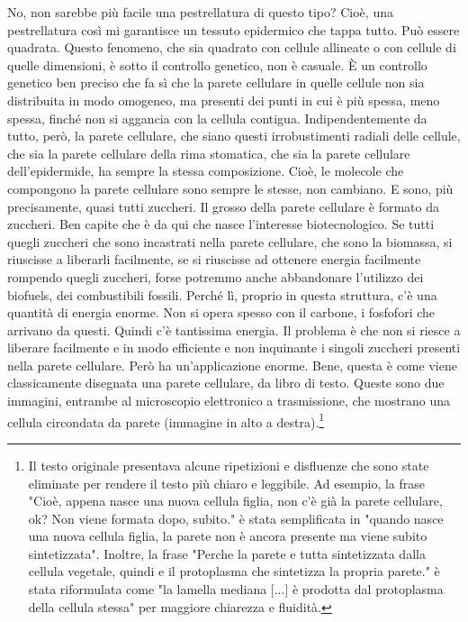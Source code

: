 \documentclass[11pt, a4paper]{article}
\begin{document}
\begin{spacing}{1.15}
No, non sarebbe più facile una pestrellatura di questo tipo? Cioè, una pestrellatura così mi garantisce un tessuto epidermico che tappa tutto. Può essere quadrata. Questo fenomeno, che sia quadrato con cellule allineate o con cellule di quelle dimensioni, è sotto il controllo genetico, non è casuale. È un controllo genetico ben preciso che fa sì che la parete cellulare in quelle cellule non sia distribuita in modo omogeneo, ma presenti dei punti in cui è più spessa, meno spessa, finché non si aggancia con la cellula contigua. Indipendentemente da tutto, però, la parete cellulare, che siano questi irrobustimenti radiali delle cellule, che sia la parete cellulare della rima stomatica, che sia la parete cellulare dell'epidermide, ha sempre la stessa composizione. Cioè, le molecole che compongono la parete cellulare sono sempre le stesse, non cambiano. E sono, più precisamente, quasi tutti zuccheri. Il grosso della parete cellulare è formato da zuccheri. Ben capite che è da qui che nasce l'interesse biotecnologico. Se tutti quegli zuccheri che sono incastrati nella parete cellulare, che sono la biomassa, si riuscisse a liberarli facilmente, se si riuscisse ad ottenere energia facilmente rompendo quegli zuccheri, forse potremmo anche abbandonare l'utilizzo dei biofuels, dei combustibili fossili. Perché lì, proprio in questa struttura, c'è una quantità di energia enorme.
Non si opera spesso con il carbone, i fosfofori che arrivano da questi. Quindi c'è tantissima energia. Il problema è che non si riesce a liberare facilmente e in modo efficiente e non inquinante i singoli zuccheri presenti nella parete cellulare. Però ha un'applicazione enorme. Bene, questa è come viene classicamente disegnata una parete cellulare, da libro di testo. Queste sono due immagini, entrambe al microscopio elettronico a trasmissione, che mostrano una cellula circondata da parete (immagine in alto a destra).\footnote{Il testo originale presentava alcune ripetizioni e disfluenze che sono state eliminate per rendere il testo più chiaro e leggibile. Ad esempio, la frase "Cioè, appena nasce una nuova cellula figlia, non c'è già la parete cellulare, ok? Non viene formata dopo, subito." è stata semplificata in "quando nasce una nuova cellula figlia, la parete non è ancora presente ma viene subito sintetizzata". Inoltre, la frase "Perche la parete e tutta sintetizzata dalla cellula vegetale, quindi e il protoplasma che sintetizza la propria parete." è stata riformulata come  "la lamella mediana [...] è prodotta dal protoplasma della cellula stessa" per maggiore chiarezza e fluidità.}

\end{spacing}
\end{document}
